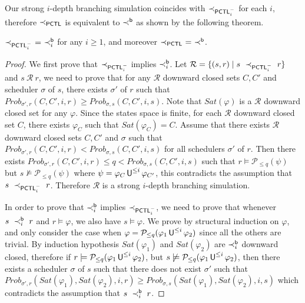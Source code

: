 \documentclass{LMCS}
\def\phi{\varphi}
\DeclareMathOperator{\U}{\text{\sf U}}
\newcommand{\PCTL}{{\sf PCTL}}
\newcommand{\iBSi}[1]{\prec_{#1}^{{\sf b}}}
\newcommand{\SEPCTL}{\prec_{\PCTL}}
\newcommand{\iSEPCTLM}[1]{\prec_{\PCTL^{-}_{#1}}}
\newcommand{\MC}[1]{\mathcal{#1}}
\newcommand{\MI}[1]{\mathit{#1}}
\newcommand{\MEASURE}{\mathit{Prob}}
\begin{document}
Our strong $i$-depth branching simulation coincides with $\iSEPCTLM{i}$ for each $i$, therefore $\SEPCTL$ is equivalent to $\iBSi{}$ as shown by the following theorem.
\begin{thm}\label{thm:characterization strong branching simulation}
$\iSEPCTLM{i}~=~\iBSi{i}$ for any $i\geq 1$, and moreover $\SEPCTL~=~\iBSi{}$.
\end{thm}
\begin{proof}
We first prove that $\iSEPCTLM{i}$ implies $\iBSi{i}$. Let $\MC{R}=\{(s,r)\mid s~\iSEPCTLM{i}~r\}$ and $s~\MC{R}~r$, we need to prove that for any $\MC{R}$ downward closed sets $C,C'$ and scheduler $\sigma$ of $s$, there exists $\sigma'$ of $r$ such that $\MEASURE_{\sigma',r}(C,C',i,r)\geq\MEASURE_{\sigma,s}(C,C',i,s)$. Note that $\MI{Sat}(\phi)$ is a $\MC{R}$ downward closed set for any $\phi$. Since the states space is finite, for each $\MC{R}$ downward closed set $C$, there exists $\phi_C$ such that $\MI{Sat}(\phi_C)=C$. Assume that there exists $\MC{R}$ downward closed sets $C,C'$ and $\sigma$ such that $\MEASURE_{\sigma',r}(C,C',i,r)<\MEASURE_{\sigma,s}(C,C',i,s)$ for all schedulers $\sigma'$ of $r$. Then there exists $\MEASURE_{\sigma',r}(C,C',i,r)\le q<\MEASURE_{\sigma,s}(C,C',i,s)$ such that $r\models\MC{P}_{\leq q}(\psi)$ but $s\not\models\MC{P}_{\leq q}(\psi)$ where $\psi=\phi_C\U^{\leq i}\phi_{C'}$, this contradicts the assumption that $s~\iSEPCTLM{i}~r$. Therefore $\MC{R}$ is a strong $i$-depth branching simulation.

In order to prove that $\iBSi{i}$ implies $\iSEPCTLM{i}$, we need to prove that whenever $s~\iBSi{i}~r$ and $r\models\phi$, we also have $s\models\phi$. We prove by structural induction on $\phi$, and only consider the case when $\phi=\MC{P}_{\leq q}(\phi_1\U^{\leq i}\phi_2)$ since all the others are trivial. By induction hypothesis $\MI{Sat}(\phi_1)$ and $\MI{Sat}(\phi_2)$ are $\iBSi{i}$ downward closed, therefore if $r\models\MC{P}_{\leq q}(\phi_1\U^{\leq i}\phi_2)$, but $s\not\models\MC{P}_{\leq q}(\phi_1\U^{\leq i}\phi_2)$, then there exists a scheduler $\sigma$ of $s$ such that there does not exist $\sigma'$ such that $\MEASURE_{\sigma',r}(\MI{Sat}(\phi_1),\MI{Sat}(\phi_2),i,r)\geq\MEASURE_{\sigma,s}(\MI{Sat}(\phi_1),\MI{Sat}(\phi_2),i,s)$ which contradicts the assumption that $s~\iBSi{i}~r$.
\end{proof}
\end{document}
